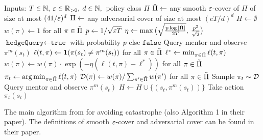 \begin{algorithm}[tb]
\centering
\begin{algorithmic}

\STATE Inputs: $T \in \mathbb{N},\: \varepsilon \in \mathbb{R}_{> 0},\: d \in \mathbb{N},\,$ policy class $\Pi$
    \STATE $\tilde{\Pi} \gets$ any smooth $\varepsilon$-cover of $\Pi$ of size at most $(41/\varepsilon)^d$
\ELSE
    \STATE $\tilde{\Pi} \gets$ any adversarial cover of size at most $(eT/d)^d$
\ENDIF
\STATE $H \gets \emptyset$
\STATE $w(\pi) \gets 1$ for all $\pi \in \tilde{\Pi}$
\STATE $p \gets 1/\sqrt{\varepsilon T}$
\STATE $\eta \gets \max\big(\sqrt{\frac{p\log |\tilde{\Pi}|}{2T}},\: \frac{p^2}{\sqrt{2}} \big)$
 \STATE {}
        \STATE $\texttt{hedgeQuery} \gets \texttt{true}$ with probability $p$ else $\texttt{false}$
                \STATE Query mentor and observe $\pi^m(s_t)$
                \STATE $\ell(t,\pi) \gets \boldsymbol{1}(\pi(s_t) \ne \pi^m(s_t))$ for all $\pi \in \tilde{\Pi}$
                \STATE $\ell^* \gets \min_{\pi \in \tilde{\Pi}} \ell(t,\pi)$
                \STATE $w(\pi) \gets w(\pi)\cdot \exp(-\eta(\ell(t,\pi) - \ell^*))$ for all $\pi \in \tilde{\Pi}$
                \STATE $\pi_t \gets \operatorname*{arg\,min}_{\pi \in \tilde{\Pi}} \ell(t, \pi)$
        \ELSE 
            \STATE $\mathcal{D}(\pi) \gets w(\pi) / \sum_{\pi' \in \tilde{\Pi}} w(\pi')$ for all $ \pi \in \tilde{\Pi}$
            \STATE Sample $\pi_t \sim \mathcal{D}$ 
        \ENDIF
             \STATE {}
                        \STATE Query mentor and observe $\pi^m(s_t)$
                        \STATE $H \gets H \cup\{(s_t, \pi^m(s_t))\}$   
                \ELSE \STATE {}
                                        \STATE Take action $\pi_t(s_t)$
                \ENDIF
\ENDFOR
\ENDFUNCTION
\end{algorithmic}
\caption{The main algorithm from \cite{plaut_avoiding_2024} for avoiding catastrophe (also Algorithm 1 in their paper). The definitions of smooth $\varepsilon$-cover and adversarial cover can be found in their paper.}
\label{alg:nd}
\end{algorithm}